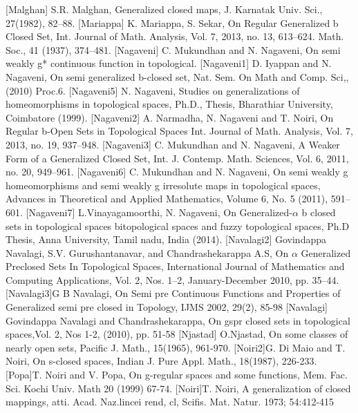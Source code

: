 \begin{thebibliography}{99}
 [Malghan] S.R. Malghan, Generalized closed maps, J. Karnatak Univ. Sci., 27(1982), 82--88.
 [Mariappa] K. Mariappa, S. Sekar, On Regular Generalized b Closed Set, Int. Journal of Math. Analysis, 	Vol. 7, 2013, no. 13, 613--624. Math. Soc., 41 (1937), 374--481.
 [Nagaveni] C. Mukundhan and N. Nagaveni, On semi weakly g* continuous function in topological. 
 [Nagaveni1] D. Iyappan and N. Nagaveni, On semi generalized b-closed set, Nat. Sem. On Math and Comp. Sci,, (2010) Proc.6.
 [Nagaveni5] N. Nagaveni, Studies on generalizations of homeomorphisms in topological spaces, Ph.D., Thesis, Bharathiar University, Coimbatore (1999).
 [Nagaveni2] A. Narmadha, N. Nagaveni and T. Noiri, On Regular b-Open Sets in Topological Spaces Int. Journal of Math. Analysis, Vol. 7, 2013, no. 19, 937--948.
 [Nagaveni3] C. Mukundhan and N. Nagaveni, A Weaker Form of a Generalized Closed Set, Int. J. Contemp. Math. Sciences, Vol. 6, 2011, no. 20, 949--961.
 [Nagaveni6] C. Mukundhan and N. Nagaveni, On semi weakly g homeomorphisms and semi weakly g irresolute maps in topological spaces, Advances in Theoretical and Applied Mathematics, Volume 6, No. 5 (2011), 591--601.
 [Nagaveni7] L.Vinayagamoorthi, N. Nagaveni, On Generalized-$\alpha$ b closed sets in topological spaces bitopological spaces and fuzzy topological spaces, Ph.D Thesis, Anna University, Tamil nadu, India (2014).
 [Navalagi2] Govindappa Navalagi, S.V. Gurushantanavar, and Chandrashekarappa A.S,  On $\alpha$ Generalized Preclosed Sets In Topological Spaces, International Journal of Mathematics and Computing Applications, Vol. 2, Nos. 1--2, January-December 2010, pp. 35--44.
 [Navalagi3]G B Navalagi, On Semi pre Continuous Functions and Properties of Generalized semi pre closed in Topology, IJMS 2002, 29(2), 85-98
 [Navalagi]	Govindappa Navalagi and Chandrashekarappa, On gspr closed sets in topological spaces,Vol. 	2, Nos 1-2, (2010), pp. 51-58
  [Njastad]	O.Njastad,   On some classes of nearly open sets,  Pacific J. Math., 15(1965), 961-970.
 [Noiri2]G. Di Maio and T. Noiri, On s-closed spaces, Indian J. Pure Appl. Math., 18(1987), 226-233.
 [Popa]T. Noiri and V. Popa, On g-regular spaces and some functions, Mem. Fac. Sci. Kochi Univ. Math 20 (1999) 67-74.
 [Noiri]T. Noiri, A generalization of closed mappings, atti. Acad. Naz.lincei rend, cl, Scifis. Mat. Natur. 1973; 54:412-415

\end{thebibliography}
